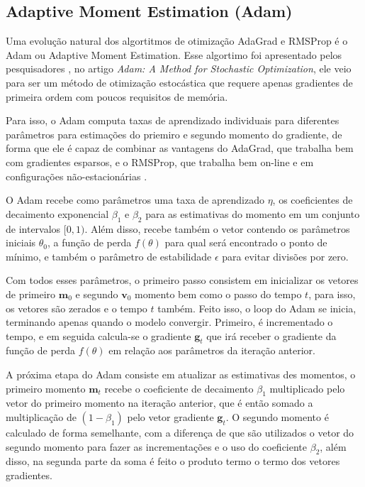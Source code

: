 \subsection{Adaptive Moment Estimation (Adam)}

Uma evolução natural dos algortitmos de otimização AdaGrad e RMSProp é o Adam ou Adaptive Moment Estimation. Esse algortimo foi apresentado pelos pesquisadores \textcite{AdamMethod}, no artigo \textit{Adam: A Method for Stochastic Optimization}, ele veio para ser um método de otimização estocástica que requere apenas gradientes de primeira ordem com poucos requisitos de memória.

Para isso, o Adam computa taxas de aprendizado individuais para diferentes parâmetros para estimações do priemiro e segundo momento do gradiente, de forma que ele é capaz de combinar as vantagens do AdaGrad, que trabalha bem com gradientes esparsos, e o RMSProp, que trabalha bem on-line e em configurações não-estacionárias \parencite{AdamMethod}.

O Adam recebe como parâmetros uma taxa de aprendizado $\eta$, os coeficientes de decaimento exponencial $\beta_1$ e $\beta_2$ para as estimativas do momento em um conjunto de intervalos $[0, 1)$. Além disso, recebe também o vetor contendo os parâmetros iniciais $\theta_0$, a função de perda $f(\theta)$ para qual será encontrado o ponto de mínimo, e também o parâmetro de estabilidade $\epsilon$ para evitar divisões por zero.

Com todos esses parâmetros, o primeiro passo consistem em inicializar os vetores de primeiro $\mathbf{m}_0$ e segundo $\mathbf{v}_0$ momento bem como o passo do tempo $t$, para isso, os vetores são zerados e o tempo $t$ também. Feito isso, o loop do Adam se inicia, terminando apenas quando o modelo convergir. Primeiro, é incrementado o tempo, e em seguida calcula-se o gradiente $\mathbf{g}_t$ que irá receber o gradiente da função de perda $f(\theta)$ em relação aos parâmetros da iteração anterior.

A próxima etapa do Adam consiste em atualizar as estimativas des momentos, o primeiro momento $\mathbf{m}_t$ recebe o coeficiente de decaimento $\beta_1$ multiplicado pelo vetor do primeiro momento na iteração anterior, que é então somado a multiplicação de $(1 - \beta_1)$ pelo vetor gradiente $\mathbf{g}_t$. O segundo momento é calculado de forma semelhante, com a diferença de que são utilizados o vetor do segundo momento para fazer as incrementações e o uso do coeficiente $\beta_2$, além disso, na segunda parte da soma é feito o produto termo o termo dos vetores gradientes.


